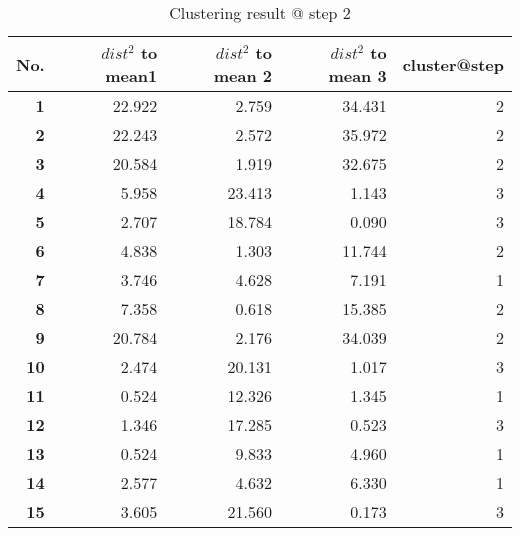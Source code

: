 \begin{table}[htbp]
  \centering
  \caption{Clustering result @ step 2}
    \begin{tabular}{rrrrr}
    \toprule
    \textbf{No.} & \textbf{$dist^2$ to mean1} & \textbf{$dist^2$ to mean 2} & \textbf{$dist^2$ to mean 3} & \textbf{cluster@step} \\
    \midrule
    \textbf{1} & 22.922  & 2.759  & 34.431  & 2 \\
    \textbf{2} & 22.243  & 2.572  & 35.972  & 2 \\
    \textbf{3} & 20.584  & 1.919  & 32.675  & 2 \\
    \textbf{4} & 5.958  & 23.413  & 1.143  & 3 \\
    \textbf{5} & 2.707  & 18.784  & 0.090  & 3 \\
    \textbf{6} & 4.838  & 1.303  & 11.744  & 2 \\
    \textbf{7} & 3.746  & 4.628  & 7.191  & 1 \\
    \textbf{8} & 7.358  & 0.618  & 15.385  & 2 \\
    \textbf{9} & 20.784  & 2.176  & 34.039  & 2 \\
    \textbf{10} & 2.474  & 20.131  & 1.017  & 3 \\
    \textbf{11} & 0.524  & 12.326  & 1.345  & 1 \\
    \textbf{12} & 1.346  & 17.285  & 0.523  & 3 \\
    \textbf{13} & 0.524  & 9.833  & 4.960  & 1 \\
    \textbf{14} & 2.577  & 4.632  & 6.330  & 1 \\
    \textbf{15} & 3.605  & 21.560  & 0.173  & 3 \\
    \bottomrule
    \end{tabular}%
  \label{tab:cluster_b2}%
\end{table}%
